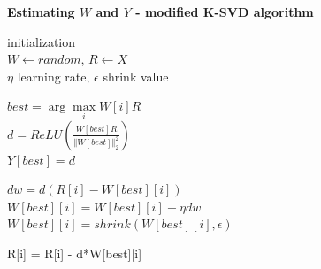 \documentclass[xcolor=dvipsnames]{beamer}
\begin{document}
\begin{frame}{\bf Estimating $W$ and $Y$ - modified K-SVD algorithm}

\begin{algorithm}[H]
 initialization  \\
                $W \gets random$, $R \gets X$ \\
                $\eta$ learning rate, $\epsilon$ shrink value \\
 {
  \color{blue}
  $best = \arg\max\limits_{i} W[i] R $ \\
  \color{red}
  $d = ReLU (\frac{W[best] R}{\Vert W[best]\Vert^2_2})$ \\
  $Y[best] = d$ \\
  \color{black}
  {
    $dw = d(R[i] - W[best][i])$ \\
    $W[best][i] = W[best][i] + \eta dw$ \\

    $W[best][i] = shrink(W[best][i], \epsilon)$

    \color{green}
    R[i] = R[i] - d*W[best][i]
  }
 }
\end{algorithm}


\end{frame}
\end{document}
